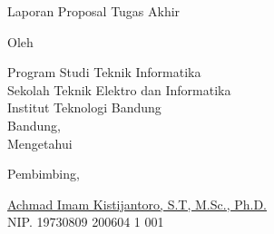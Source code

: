 \clearpage
\pagestyle{empty}

\begin{center}
  \smallskip
  
  \Large \bfseries \MakeUppercase{\thetitle}
  \vfill
  
  \Large Laporan Proposal Tugas Akhir
  \vfill
  
  \large Oleh
  
  \Large \theauthor
  
  \large Program Studi Teknik Informatika \\
  
  \normalsize \normalfont
  Sekolah Teknik Elektro dan Informatika \\
  Institut Teknologi Bandung \\
  
  \vfill
  \normalsize \normalfont
  Bandung, \tanggalpengesahan \\
  Mengetahui

  \vspace{0.5cm}
  Pembimbing,
  
  \vfill
  \underline{Achmad Imam Kistijantoro, S.T, M.Sc., Ph.D.
  } \\
  NIP. 19730809 200604 1 001
  
\end{center}
\clearpage
